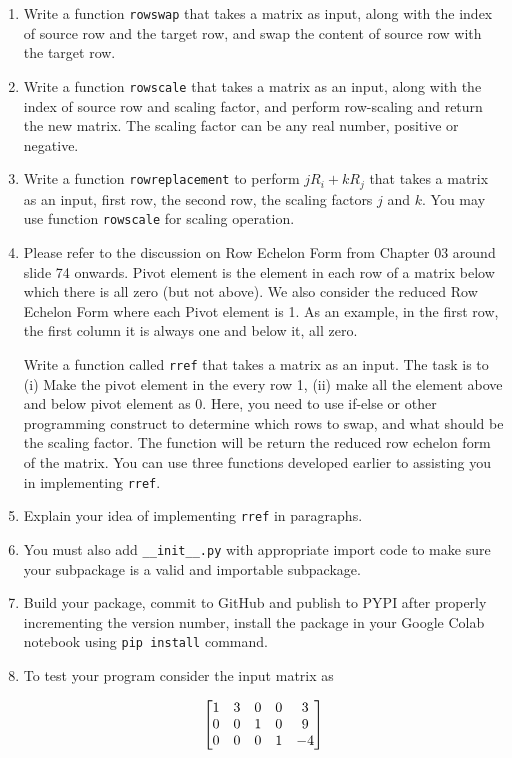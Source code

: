 \documentclass[12pt, xcolor=dvipsnames,svgnames,x11names]{article}
\makeatletter
\newenvironment{multiequation}[1][]{%
\begin{equation}%
   \begin{aligned}%
   \ifx#1\@empty\else\label{#1}\fi%
}{%
   \end{aligned}%
\end{equation}%
}
\makeatother
\begin{document}
\begin{enumerate}
   \item Write a function \texttt{rowswap} that takes a matrix as input, along with the index of source row and the target row, and swap the content of source row with the target row.
   \item Write a function \texttt{rowscale} that takes a matrix as an input, along with the index of source row and scaling factor, and perform row-scaling and return the new matrix. The scaling factor can be any real number, positive or negative.
   \item Write a function \texttt{rowreplacement} to perform $jR_i + kR_j$ that takes a matrix as an input, first row, the second row, the scaling factors $j$ and $k$. You may use function \texttt{rowscale} for scaling operation.
   \item Please refer to the discussion on Row Echelon Form from Chapter 03 around slide 74 onwards. Pivot element is the element in each row of a matrix below which there is all zero (but not above). We also consider the reduced Row Echelon Form where each Pivot element is 1. As an example, in the first row, the first column it is always one and below it, all zero.
   
   Write a function called \texttt{rref} that takes a matrix as an input. The task is to (i) Make the pivot element in the every row 1, (ii) make all the element above and below pivot element as 0. Here, you need to use if-else or other programming construct to determine which rows to swap, and what should be the scaling factor. The function will be return the reduced row echelon form of the matrix. You can use three functions developed earlier to assisting you in implementing \texttt{rref}.
   \item Explain your idea of implementing \texttt{rref} in paragraphs.
   \item You must also add \texttt{\_\_init\_\_.py} with appropriate import code to make sure your subpackage is a valid and importable subpackage.
   \item Build your package, commit to GitHub and publish to PYPI after properly incrementing the version number, install the package in your Google Colab notebook using \texttt{pip install} command.
   \item To test your program consider the input matrix as 
   
   \begin{multiequation}
      \begin{bmatrix}
      1 & 3 & 0 & 0 & 3\\
      0 & 0 & 1 & 0 & 9\\
      0 & 0 & 0 & 1 & -4
   \end{bmatrix}
   \end{multiequation}


\end{enumerate}
\end{document}
